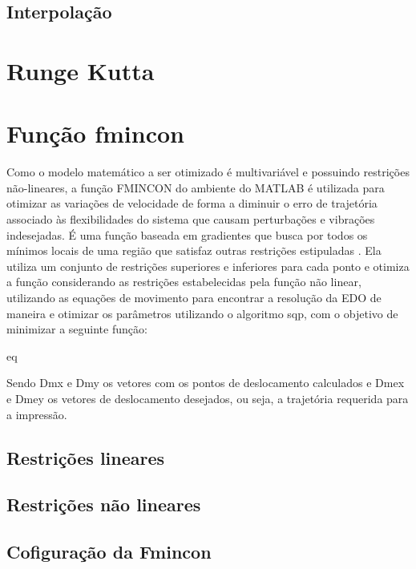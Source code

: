 \subsection{Interpolação}

\section{Runge Kutta}

\section{Função fmincon}
Como o modelo matemático a ser otimizado é multivariável e 
possuindo restrições não-lineares, a função FMINCON do ambiente 
do MATLAB é utilizada para otimizar as variações de velocidade 
de forma a diminuir o erro de trajetória associado às 
flexibilidades do sistema que causam perturbações e vibrações 
indesejadas.
É uma função baseada em gradientes que busca por todos os 
mínimos locais de uma região que satisfaz outras restrições 
estipuladas \cite{albaghdadi21}.
Ela utiliza um conjunto de restrições superiores e inferiores 
para cada ponto e otimiza a função considerando as restrições 
estabelecidas pela função não linear, utilizando as equações de 
movimento para encontrar a resolução da EDO de maneira e 
otimizar os parâmetros utilizando o algoritmo sqp, com o 
objetivo de minimizar a seguinte função:

eq

Sendo Dmx e Dmy os vetores com os pontos de deslocamento 
calculados e Dmex e Dmey os vetores de deslocamento desejados, 
ou seja, a trajetória requerida para a impressão.

\subsection{Restrições lineares}
\subsection{Restrições não lineares}
\subsection{Cofiguração da Fmincon}
